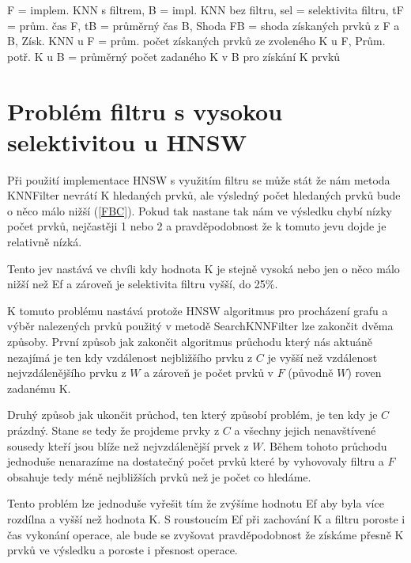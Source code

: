 \documentclass[czech,semestral,dept460,male,csharp,cpdeclaration]{diploma}
\begin{document}
\begin{center}
			{\footnotesize *F = implem. KNN s filtrem, B = impl. KNN bez filtru, sel = selektivita filtru, tF = prům. čas F, tB = průměrný čas B, Shoda FB = shoda získaných prvků z F a B, Získ. KNN u F = prům. počet získaných prvků ze zvoleného K u F, Prům. potř. K u B = průměrný počet zadaného K v B pro získání K prvků}\\
			
		
		\end{center}
		
		\section{Problém filtru s vysokou selektivitou u HNSW}
		\label{FP}
		
			Při použití implementace HNSW s využitím filtru se může stát že nám metoda KNNFilter nevrátí K hledaných prvků, ale výsledný počet hledaných prvků bude o něco málo nižší (\ref{FBC}). Pokud tak nastane tak nám ve výsledku chybí nízky počet prvků, nejčastěji 1 nebo 2 a pravděpodobnost že k tomuto jevu dojde je relativně nízká.
			
			Tento jev nastává ve chvíli kdy hodnota K je stejně vysoká nebo jen o něco málo nižší než Ef a zároveň je selektivita filtru vyšší, do 25\%.
			
			K tomuto problému nastává protože HNSW algoritmus pro procházení grafu a výběr nalezených prvků použitý v metodě SearchKNNFilter lze zakončit dvěma způsoby. První způsob jak zakončit algoritmus průchodu který nás aktuáně nezajímá je ten kdy vzdálenost nejbližšího prvku z $C$ je vyšší než vzdálenost nejvzdálenějšího prvku z $W$ a zároveň je počet prvků v $F$ (původně $W$) roven zadanému K.
			
			Druhý způsob jak ukončit průchod, ten který způsobí problém, je ten kdy je $C$ prázdný. Stane se tedy že projdeme prvky z $C$ a všechny jejich nenavštívené sousedy kteří jsou blíže než nejvzdálenější prvek z $W$. Během tohoto průchodu jednoduše nenarazíme na dostatečný počet prvků které by vyhovovaly filtru a $F$ obsahuje tedy méně nejbližších prvků než je počet co hledáme.
			
			Tento problém lze jednoduše vyřešit tím že zvýšíme hodnotu Ef aby byla více rozdílna a vyšší než hodnota K. S roustoucím Ef při zachování K a filtru poroste i čas vykonání operace, ale bude se zvyšovat pravděpodobnost že získáme přesně K prvků ve výsledku a poroste i přesnost operace.
	
\end{document}
